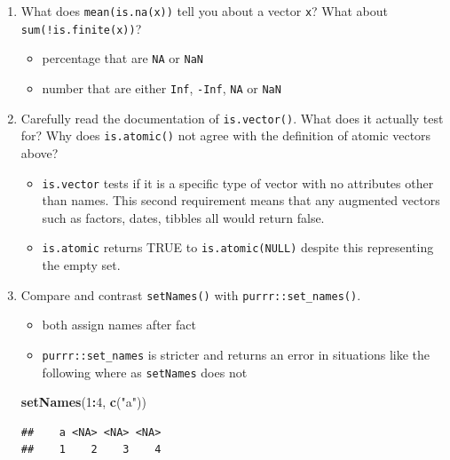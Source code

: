 \documentclass[]{book}
\newenvironment{Shaded}{\begin{snugshade}}{\end{snugshade}}
\newcommand{\DecValTok}[1]{\textcolor[rgb]{0.00,0.00,0.81}{#1}}
\newcommand{\KeywordTok}[1]{\textcolor[rgb]{0.13,0.29,0.53}{\textbf{#1}}}
\newcommand{\NormalTok}[1]{#1}
\newcommand{\OperatorTok}[1]{\textcolor[rgb]{0.81,0.36,0.00}{\textbf{#1}}}
\newcommand{\StringTok}[1]{\textcolor[rgb]{0.31,0.60,0.02}{#1}}
\providecommand{\tightlist}{%
  \setlength{\itemsep}{0pt}\setlength{\parskip}{0pt}}
\theoremstyle{definition}
\theoremstyle{definition}
\theoremstyle{definition}
\theoremstyle{remark}
\begin{document}
\begin{enumerate}
\def\labelenumi{\arabic{enumi}.}
\item
  What does \texttt{mean(is.na(x))} tell you about a vector \texttt{x}?
  What about \texttt{sum(!is.finite(x))}?

  \begin{itemize}
  \tightlist
  \item
    percentage that are \texttt{NA} or \texttt{NaN}
  \item
    number that are either \texttt{Inf}, \texttt{-Inf}, \texttt{NA} or
    \texttt{NaN}
  \end{itemize}
\item
  Carefully read the documentation of \texttt{is.vector()}. What does it
  actually test for? Why does \texttt{is.atomic()} not agree with the
  definition of atomic vectors above?

  \begin{itemize}
  \tightlist
  \item
    \texttt{is.vector} tests if it is a specific type of vector with no
    attributes other than names. This second requirement means that any
    augmented vectors such as factors, dates, tibbles all would return
    false.
  \item
    \texttt{is.atomic} returns TRUE to \texttt{is.atomic(NULL)} despite
    this representing the empty set.
  \end{itemize}
\item
  Compare and contrast \texttt{setNames()} with
  \texttt{purrr::set\_names()}.

  \begin{itemize}
  \tightlist
  \item
    both assign names after fact
  \item
    \texttt{purrr::set\_names} is stricter and returns an error in
    situations like the following where as \texttt{setNames} does not
  \end{itemize}

\begin{Shaded}
\begin{Highlighting}[]
\KeywordTok{setNames}\NormalTok{(}\DecValTok{1}\OperatorTok{:}\DecValTok{4}\NormalTok{, }\KeywordTok{c}\NormalTok{(}\StringTok{"a"}\NormalTok{))}
\end{Highlighting}
\end{Shaded}

\begin{verbatim}
##    a <NA> <NA> <NA> 
##    1    2    3    4
\end{verbatim}


\end{enumerate}
\end{document}
